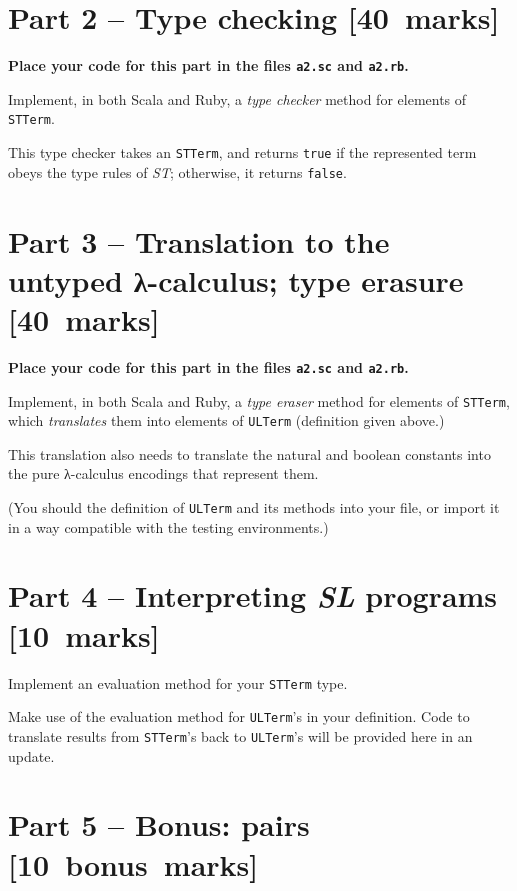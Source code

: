\documentclass[11pt]{article}
\begin{document}
\section*{Part 2 – Type checking                                       [40 marks]}
\label{sec:org9ad6d36}
\begin{center}
\textbf{Place your code for this part in the files \texttt{a2.sc} and \texttt{a2.rb}.}
\end{center}

Implement, in both Scala and Ruby,
a \emph{type checker} method for elements of \texttt{STTerm}.

This type checker takes an \texttt{STTerm}, and returns \texttt{true} if
the represented term obeys the type rules of \emph{ST};
otherwise, it returns \texttt{false}.

\section*{Part 3 – Translation to the untyped λ-calculus; type erasure [40 marks]}
\label{sec:org11a0953}
\begin{center}
\textbf{Place your code for this part in the files \texttt{a2.sc} and \texttt{a2.rb}.}
\end{center}

Implement, in both Scala and Ruby,
a \emph{type eraser} method for elements of \texttt{STTerm},
which \emph{translates} them into elements of \texttt{ULTerm} (definition given above.)

This translation also needs to translate the natural and boolean constants
into the pure λ-calculus encodings that represent them.

(You should the definition of \texttt{ULTerm} and its methods into your file,
or import it in a way compatible with the testing environments.)

\section*{Part 4 – Interpreting \emph{SL} programs                            [10 marks]}
\label{sec:org9df7253}

Implement an evaluation method for your \texttt{STTerm} type.

Make use of the evaluation method for \texttt{ULTerm}'s in your definition.
Code to translate results from \texttt{STTerm}'s back to \texttt{ULTerm}'s will be provided
here in an update.

\section*{Part 5 – Bonus: pairs                                        [10 bonus marks]}
\label{sec:orgbd53bca}
\end{document}
